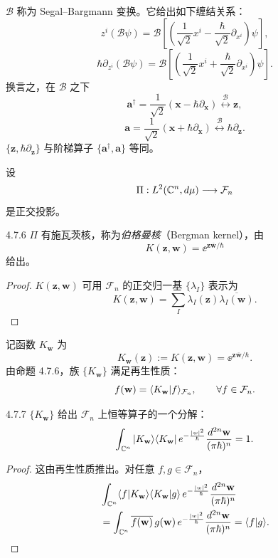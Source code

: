 $\mathcal B$ 称为 Segal–Bargmann 变换。它给出如下缠结关系：
\[
z^i(\mathcal B\psi)
=\mathcal B\left[\left(\frac{1}{\sqrt2}x^i
-\frac{\hbar}{\sqrt2}\partial_{x^i}\right)\psi\right],
\]
\[
\hbar\partial_{z^i}(\mathcal B\psi)
=\mathcal B\left[\left(\frac{1}{\sqrt2}x^i
+\frac{\hbar}{\sqrt2}\partial_{x^i}\right)\psi\right].
\]
换言之，在 $\mathcal B$ 之下
\[
\mathbf a^\dagger=\frac{1}{\sqrt2}(\mathbf x-\hbar\partial_{\mathbf x})
\overset{\mathcal B}{\longleftrightarrow}\mathbf z,
\]
\[
\mathbf a=\frac{1}{\sqrt2}(\mathbf x+\hbar\partial_{\mathbf x})
\overset{\mathcal B}{\longleftrightarrow}\hbar\partial_{\mathbf z}.
\]
$\{\mathbf z,\hbar\partial_{\mathbf z}\}$ 与阶梯算子
$\{\mathbf a^\dagger,\mathbf a\}$ 等同。

设
\[
\Pi:L^2(\mathbb{C}^n,d\mu)\longrightarrow\mathcal F_n
\]
是正交投影。

\begin{proposition}{4.7.6}
  $\Pi$ 有施瓦茨核，称为\emph{伯格曼核}（Bergman kernel），由
  \[
  K(\mathbf z,\mathbf w)=\ee^{\mathbf z\overline{\mathbf w}/\hbar}
  \]
  给出。
\end{proposition}

\begin{proof}
$K(\mathbf z,\mathbf w)$ 可用 $\mathcal F_n$ 的正交归一基
$\{\lambda_I\}$ 表示为
\[
K(\mathbf z,\mathbf w)=\sum_I\lambda_I(\mathbf z)
\overline{\lambda_I(\mathbf w)}.
\]
\end{proof}

记函数 $K_{\mathbf w}$ 为
\[
K_{\mathbf w}(\mathbf z):=K(\mathbf z,\mathbf w)
=\ee^{\mathbf z\overline{\mathbf w}/\hbar}.
\]
由命题 4.7.6，族 $\{K_{\mathbf w}\}$ 满足再生性质：
\[
f(\mathbf w)=\langle K_{\mathbf w}|f\rangle_{\mathcal F_n},
\qquad\forall f\in\mathcal F_n.
\]

\begin{proposition}{4.7.7}
  $\{K_{\mathbf w}\}$ 给出 $\mathcal F_n$ 上恒等算子的一个分解：
  \[
  \int_{\mathbb{C}^n}|K_{\mathbf w}\rangle\langle K_{\mathbf w}|\,
  e^{-\frac{|w|^2}{\hbar}}\frac{d^{2n}\mathbf w}{(\pi\hbar)^n}=1.
  \]
\end{proposition}

\begin{proof}
这由再生性质推出。对任意 $f,g\in\mathcal F_n$，
\begin{align*}
&\int_{\mathbb{C}^n}\langle f|K_{\mathbf w}\rangle\langle K_{\mathbf w}|g\rangle\,
e^{-\frac{|w|^2}{\hbar}}\frac{d^{2n}\mathbf w}{(\pi\hbar)^n}\\
&=\int_{\mathbb{C}^n}\overline{f(\mathbf w)}\,g(\mathbf w)\,
e^{-\frac{|w|^2}{\hbar}}\frac{d^{2n}\mathbf w}{(\pi\hbar)^n}
=\langle f|g\rangle.
\end{align*}
\end{proof}

